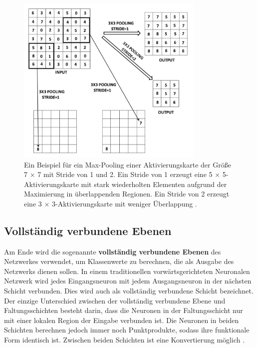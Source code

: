 \begin{figure}[H]
    \centering
    \includegraphics[width=9cm]{kapitel2/maxpooling.png}
    \caption[Max-Pooling]{Ein Beispiel für ein Max-Pooling einer Aktivierungskarte der Größe 7 × 7 mit Stride von 1 und 2. Ein Stride von 1 erzeugt eine 5 × 5-Aktivierungskarte mit stark wiederholten Elementen aufgrund der Maximierung in überlappenden Regionen. Ein Stride von 2 erzeugt eine 3 × 3-Aktivierungskarte mit weniger Überlappung \cite*[326]{Aggarwal2018}.}
    \label{Kap2:Pooling}
\end{figure}


\subsection{Vollständig verbundene Ebenen}
Am Ende wird die sogenannte \textbf{vollständig verbundene Ebenen} des Netzwerkes verwendet, um Klassenwerte zu berechnen, die als Ausgabe des Netzwerks dienen sollen. In einem traditionellen vorwärtsgerichteten Neuronalen Netzwerk wird jedes Eingangsneuron mit jedem Ausgangsneuron in der nächsten Schicht verbunden. Dies wird auch als vollständig verbundene Schicht bezeichnet. Der einzige Unterschied zwischen der vollständig verbundene Ebene und Faltungsschichten besteht darin, dass die Neuronen in der Faltungsschicht nur mit einer lokalen Region der Eingabe verbunden ist. Die Neuronen in beiden Schichten berechnen jedoch immer noch Punktprodukte, sodass ihre funktionale Form identisch ist. Zwischen beiden Schichten ist eine Konvertierung möglich \cite*{StanfordUniversityCoursecs231n2018a}.

